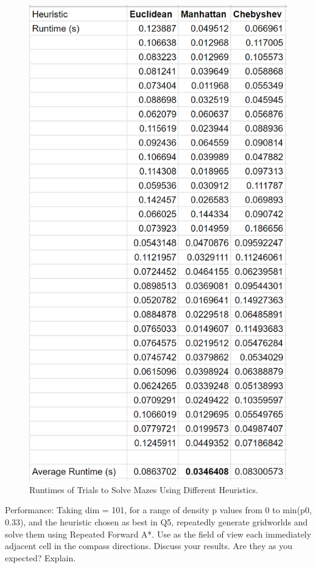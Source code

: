\documentclass{homeworg}
\begin{document}
\begin{figure}[h]
  	\centering
  	\includegraphics*[scale=0.3]{Q5 Data for Best Heuristic.png}
	\caption{Runtimes of Trials to Solve Mazes Using Different Heuristics.}
	\label{fig:example}
\end{figure}

\newpage
\exercise*
Performance: Taking dim = 101, for a range of density p values from 0 to min(p0, 0.33), and the heuristic chosen as best in Q5, repeatedly generate gridworlds and solve them using Repeated
Forward A*. Use as the field of view each immediately adjacent cell in the compass directions. Discuss your results. Are they as you expected? Explain.
\end{document}

